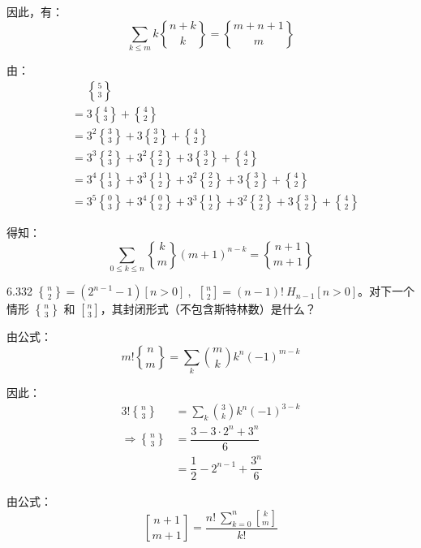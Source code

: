 因此，有：
\[
  \sum_{k \leqslant m} k \genfrac{\{}{\}}{0pt}{} {n+k}{k} = \genfrac{\{}{\}}{0pt}{} {m+n+1}{m}
\]

由：
\begin{align*}
  &\phantom{=} \genfrac{\{}{\}}{0pt}{} {5}{3} \\
  &= 3 \genfrac{\{}{\}}{0pt}{} {4}{3} + \genfrac{\{}{\}}{0pt}{} {4}{2} \\
  &= 3^2 \genfrac{\{}{\}}{0pt}{} {3}{3} + 3 \genfrac{\{}{\}}{0pt}{} {3}{2} + \genfrac{\{}{\}}{0pt}{} {4}{2} \\
  &= 3^3 \genfrac{\{}{\}}{0pt}{} {2}{3} + 3^2 \genfrac{\{}{\}}{0pt}{} {2}{2} + 3 \genfrac{\{}{\}}{0pt}{} {3}{2} + \genfrac{\{}{\}}{0pt}{} {4}{2} \\
  &= 3^4 \genfrac{\{}{\}}{0pt}{} {1}{3} + 3^3  \genfrac{\{}{\}}{0pt}{} {1}{2} + 3^2 \genfrac{\{}{\}}{0pt}{} {2}{2} + 3 \genfrac{\{}{\}}{0pt}{} {3}{2} + \genfrac{\{}{\}}{0pt}{} {4}{2} \\
  &= 3^5 \genfrac{\{}{\}}{0pt}{} {0}{3} + 3^4 \genfrac{\{}{\}}{0pt}{} {0}{2} + 3^3 \genfrac{\{}{\}}{0pt}{} {1}{2} + 3^2 \genfrac{\{}{\}}{0pt}{} {2}{2} + 3 \genfrac{\{}{\}}{0pt}{} {3}{2} + \genfrac{\{}{\}}{0pt}{} {4}{2}
\end{align*}

得知：
\[
  \sum_{0 \leqslant k \leqslant n} \genfrac{\{}{\}}{0pt}{} {k}{m} (m+1)^{n-k} = \genfrac{\{}{\}}{0pt}{} {n+1}{m+1}
\]

\begin{problem}{6.33}{2}
  \( \displaystyle\genfrac{\{}{\}}{0pt}{} {n}{2} = (2^{n-1} - 1) [n > 0] \ , \ \ \genfrac{[}{]}{0pt}{} {n}{2} = (n-1)! \ H_{n-1} [n > 0] \)。对下一个情形 \( \displaystyle\genfrac{\{}{\}}{0pt}{} {n}{3} \) 和 \( \displaystyle\genfrac{[}{]}{0pt}{} {n}{3} \)，其封闭形式（不包含斯特林数）是什么？
\end{problem}

由公式：
\[
  \boxed{m! \genfrac{\{}{\}}{0pt}{} {n}{m} = \sum_k \binom{m}{k} k^n (-1)^{m-k}}
\]

因此：
\begin{align*}
  3! \genfrac{\{}{\}}{0pt}{} {n}{3} &= \sum_k \binom{3}{k} k^n (-1)^{3-k} \\
  \Rightarrow \genfrac{\{}{\}}{0pt}{} {n}{3} &= \dfrac{3 - 3 \cdot 2^n + 3^n}{6} \\
  &= \dfrac{1}{2} - 2^{n-1} + \dfrac{3^n}{6}
\end{align*}

由公式：
\[
  \boxed{\genfrac{[}{]}{0pt}{} {n+1}{m+1} = \dfrac{n! \ \sum_{k=0}^n \genfrac{[}{]}{0pt}{} {k}{m}}{k!}}
\]

